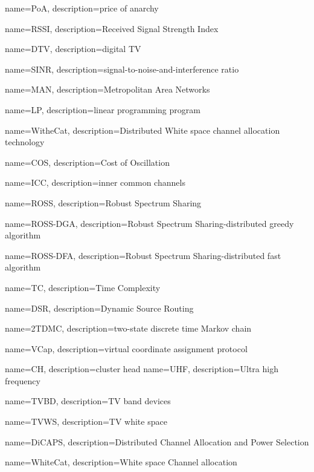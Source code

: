 {
    name=PoA,
    description={price of anarchy}
}


{
    name=RSSI,
    description={Received Signal Strength Index}
}


{
    name=DTV,
    description={digital TV}
}

{
    name=SINR,
    description={signal-to-noise-and-interference ratio}
}

{
    name=MAN,
    description={Metropolitan Area Networks}
}

{
    name=LP,
    description={linear programming program}
}

{
    name=WitheCat,
    description={Distributed White space channel allocation technology}
}

{
    name=COS,
    description={Cost of Oscillation}
}

{
    name=ICC,
    description={inner common channels}
}

{
    name=ROSS,
    description={Robust Spectrum Sharing}
}

{
    name=ROSS-DGA,
    description={Robust Spectrum Sharing-distributed greedy algorithm}
}

{
    name=ROSS-DFA,
    description={Robust Spectrum Sharing-distributed fast algorithm}
}


{
    name=TC,
    description={Time Complexity}
}

{
    name=DSR,
    description={Dynamic Source Routing}
}

{
    name=2TDMC,
    description={two-state discrete time Markov chain}
}

{
    name=VCap,
    description={virtual coordinate assignment protocol}
}


{
    name=CH,
    description={cluster head}
}
{
    name=UHF,
    description={Ultra high frequency}
}


{
    name=TVBD,
    description={TV band devices}
}

{
    name=TVWS,
    description={TV white space}
}

{
    name=DiCAPS,
    description={Distributed Channel Allocation and Power Selection}
}

{
    name=WhiteCat,
    description={White space Channel allocation}
}
